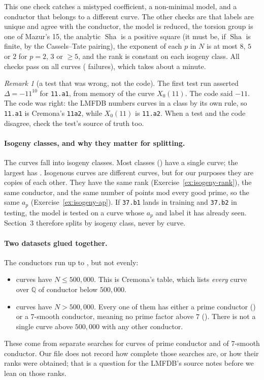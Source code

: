 \documentclass[11pt]{article}
\theoremstyle{definition}
\theoremstyle{plain}
\theoremstyle{remark}
\newtheorem{remark}[definition]{Remark}
\newcommand{\Q}{\mathbb{Q}}
\newcommand{\code}[1]{\texttt{#1}}
\renewcommand{\_}{\oldunderscore\allowbreak}
\DeclareMathOperator{\Sha}{Sha}
\begin{document}
\noindent This one check catches a mistyped coefficient, a non-minimal model, and a
conductor that belongs to a different curve. The other checks are that labels are unique and
agree with the conductor, the model is reduced, the torsion group is one of Mazur's 15, the
analytic $\Sha$ is a positive square (it must be, if $\Sha$ is finite, by the Cassels--Tate
pairing), the exponent of each $p$ in $N$ is at most $8$, $5$ or $2$ for $p=2$, $3$ or $\ge5$, and
the rank is constant on each isogeny class. All \NChecks{} checks pass on all \NCurves{} curves
(\NFailures{} failures), which takes about a minute.

\begin{remark}[a test that was wrong, not the code]
The first test run asserted $\Delta=-11^{10}$ for \code{11.a1}, from memory of the curve
$X_0(11)$. The code said $-11$. The code was right: the LMFDB numbers curves in a class by its
own rule, so \code{11.a1} is Cremona's \code{11a2}, while $X_0(11)$ is \code{11.a2}. When a
test and the code disagree, check the test's source of truth too.
\end{remark}

\paragraph{Isogeny classes, and why they matter for splitting.}
The \NCurves{} curves fall into \NClasses{} isogeny classes. Most classes (\NSingletonClasses)
have a single curve; the largest has \MaxClassSize. Isogenous curves are different curves, but
for our purposes they are copies of each other. They have the same rank
(Exercise~\ref{ex:isogeny-rank}), the same conductor, and the same number of points mod every
good prime, so the same $a_p$ (Exercise~\ref{ex:isogeny-ap}). If \code{37.b1} lands in training
and \code{37.b2} in testing, the model is tested on a curve whose $a_p$ and label it has already
seen. Section~3 therefore splits by isogeny class, never by curve.

\paragraph{Two datasets glued together.}
The conductors run up to \MaxConductor, but not evenly:
\begin{itemize}[nosep]
  \item \NComplete{} curves have $N\le500{,}000$. This is Cremona's table, which lists
        \emph{every} curve over $\Q$ of conductor below $500{,}000$.
  \item \NHigh{} curves have $N>500{,}000$. Every one of them has either a prime conductor
        (\NHighPrime) or a 7-smooth conductor, meaning no prime factor above $7$
        (\NHighSmooth). There is not a single curve above $500{,}000$ with any other conductor.
\end{itemize}
These come from separate searches for curves of prime conductor and of 7-smooth conductor.
Our file does not record how complete those searches are, or how their ranks were obtained;
that is a question for the LMFDB's source notes before we lean on those ranks.
\end{document}
